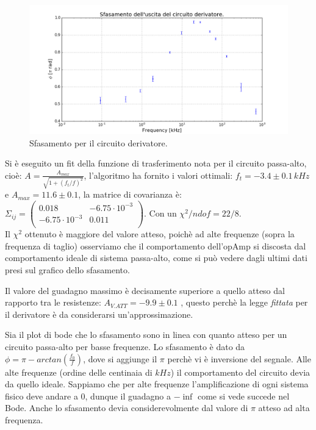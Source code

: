 \documentclass[10pt,a4paper]{article}
\begin{document}
\begin{figure}[!htb]
\centering
   \includegraphics[scale=.5]{derivatoreSfasamento.png}
\caption{Sfasamento per il circuito derivatore.}
\label{sfasamentoDerivatore}
\end{figure}

Si è eseguito un fit della funzione di trasferimento nota per il circuito passa-alto, cioè:
$ A=\frac{A_{max}}{\sqrt{1+(f_t/f)^2}}$, l'algoritmo ha fornito i valori ottimali: $f_t = -3.4 \pm 0.1 \, kHz$ e $A_{max} = 11.6 \pm 0.1$, la matrice di covarianza è: $ \Sigma_{ij} = \left( \begin{array}{cc}
 0.018 & -6.75 \cdot 10^{-3} \\ 
-6.75 \cdot 10^{-3} & 0.011\\
\end{array} \right)$. 
Con un $\chi^2/ndof = 22/8$.\\
Il $\chi^2$ ottenuto è maggiore del valore atteso, poichè ad alte frequenze (sopra la frequenza di taglio) osserviamo che il comportamento dell'opAmp si discosta dal comportamento ideale di sistema passa-alto, come si può vedere dagli ultimi dati presi sul grafico dello sfasamento.

Il valore del guadagno massimo è decisamente superiore a quello atteso dal rapporto tra le resistenze: $A_{V.ATT}= -9.9 \pm 0.1$ , questo perchè la legge \emph{fittata} per il derivatore è da considerarsi un'approssimazione.

Sia il plot di bode che lo sfasamento sono in linea con quanto atteso per un circuito passa-alto per basse frequenze. Lo sfasamento è dato da $\phi = \pi - arctan \left( \frac{f_0}{f} \right)$, dove si aggiunge il $\pi$ perchè vi è inversione del segnale. Alle alte frequenze (ordine delle centinaia di $kHz$) il comportamento del circuito devia da quello ideale. Sappiamo che per alte frequenze l'amplificazione di ogni sistema fisico deve andare a 0, dunque il guadagno a $-\inf$ come si vede succede nel Bode. Anche lo sfasamento devia considerevolmente dal valore di $\pi$ atteso ad alta frequenza.
\end{document}
